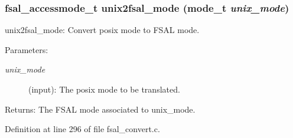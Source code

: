 \subsubsection[{unix2fsal\_\-mode}]{\setlength{\rightskip}{0pt plus 5cm}fsal\_\-accessmode\_\-t unix2fsal\_\-mode (mode\_\-t {\em unix\_\-mode})}\label{fsal__convert_8c_af1ff789aff0ed7114b8e525e01e268c}


unix2fsal\_\-mode: Convert posix mode to FSAL mode.

\begin{Desc}
\item[Parameters:]
\begin{description}
\item[{\em unix\_\-mode}](input): The posix mode to be translated.\end{description}
\end{Desc}
\begin{Desc}
\item[Returns:]The FSAL mode associated to unix\_\-mode. \end{Desc}


Definition at line 296 of file fsal\_\-convert.c.